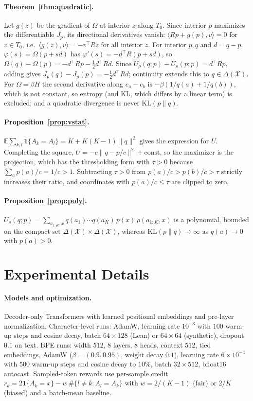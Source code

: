 \documentclass[11pt]{article}
\theoremstyle{definition}
\newcommand{\X}{\mathcal{X}}
\newcommand{\Del}{\Delta(\X)}
\newcommand{\E}{\mathbb{E}}
\newcommand{\one}{\mathbf{1}}
\newcommand{\KL}{\mathrm{KL}}
\begin{document}
\paragraph{Theorem~\ref{thm:quadratic}.} Let $g(z)$ be the gradient of $\Omega$ at interior $z$ along $T_0$. Since interior $p$ maximizes the differentiable $J_p$, its directional derivatives vanish: $\langle Rp+g(p),v\rangle=0$ for $v\in T_0$, i.e.\ $\langle g(z),v\rangle=-v^\top Rz$ for all interior $z$. For interior $p,q$ and $d=q-p$, $\varphi(s)=\Omega(p+sd)$ has $\varphi'(s)=-d^\top R(p+sd)$, so $\Omega(q)-\Omega(p)=-d^\top Rp-\frac12d^\top Rd$. Since $U_\rho(q;p)-U_\rho(p;p)=d^\top Rp$, adding gives $J_p(q)-J_p(p)=-\frac12d^\top Rd$; continuity extends this to $q\in\Del$. For $\Omega=\beta H$ the second derivative along $e_a-e_b$ is $-\beta(1/q(a)+1/q(b))$, which is not constant, so entropy (and KL, which differs by a linear term) is excluded; and a quadratic divergence is never $\KL(p\|q)$.

\paragraph{Proposition~\ref{prop:vstat}.} $\E\sum_{k,l}\one\{A_k=A_l\}=K+K(K-1)\|q\|^2$ gives the expression for $U$. Completing the square, $U=-c\|q-p/c\|^2+\mathrm{const}$, so the maximizer is the projection, which has the thresholding form with $\tau>0$ because $\sum_ap(a)/c=1/c>1$. Subtracting $\tau>0$ from $p(a)/c>p(b)/c>\tau$ strictly increases their ratio, and coordinates with $p(a)/c\le\tau$ are clipped to zero.

\paragraph{Proposition~\ref{prop:poly}.} $U_\rho(q;p)=\sum_{a_{1:K},x}q(a_1)\cdots q(a_K)\,p(x)\,\rho(a_{1:K},x)$ is a polynomial, bounded on the compact set $\Del\times\Del$, whereas $\KL(p\|q)\to\infty$ as $q(a)\to0$ with $p(a)>0$.

\section{Experimental Details}\label{app:exp}

\paragraph{Models and optimization.} Decoder-only Transformers with learned positional embeddings and pre-layer normalization. Character-level runs: AdamW, learning rate $10^{-3}$ with $100$ warm-up steps and cosine decay, batch $64\times128$ (Lean) or $64\times64$ (synthetic), dropout $0.1$ on text. BPE runs: width $512$, $8$ layers, $8$ heads, context $512$, tied embeddings, AdamW ($\beta=(0.9,0.95)$, weight decay $0.1$), learning rate $6\times10^{-4}$ with $500$ warm-up steps and cosine decay to $10\%$, batch $32\times512$, bfloat16 autocast. Sampled-token rewards use per-sample credit $r_k=2\one\{A_k=x\}-w\,\#\{l\ne k:A_l=A_k\}$ with $w=2/(K-1)$ (fair) or $2/K$ (biased) and a batch-mean baseline.
\end{document}
